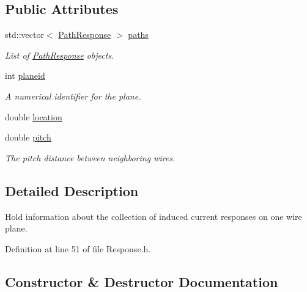 \subsection*{Public Attributes}
\begin{DoxyCompactItemize}
\item 
std\+::vector$<$ \hyperlink{struct_wire_cell_1_1_response_1_1_schema_1_1_path_response}{Path\+Response} $>$ \hyperlink{struct_wire_cell_1_1_response_1_1_schema_1_1_plane_response_a3c93c99a96e85b80eb298d12356d3e50}{paths}
\begin{DoxyCompactList}\small\item\em List of \hyperlink{struct_wire_cell_1_1_response_1_1_schema_1_1_path_response}{Path\+Response} objects. \end{DoxyCompactList}\item 
int \hyperlink{struct_wire_cell_1_1_response_1_1_schema_1_1_plane_response_ab039eb6a235ccaad959a333759584801}{planeid}
\begin{DoxyCompactList}\small\item\em A numerical identifier for the plane. \end{DoxyCompactList}\item 
double \hyperlink{struct_wire_cell_1_1_response_1_1_schema_1_1_plane_response_aacc9dfe4e52b217a966dba448a34cf88}{location}
\item 
double \hyperlink{struct_wire_cell_1_1_response_1_1_schema_1_1_plane_response_a75ace824dc59dc7b45953987c8e5c3b4}{pitch}
\begin{DoxyCompactList}\small\item\em The pitch distance between neighboring wires. \end{DoxyCompactList}\end{DoxyCompactItemize}


\subsection{Detailed Description}
Hold information about the collection of induced current responses on one wire plane. 

Definition at line 51 of file Response.\+h.



\subsection{Constructor \& Destructor Documentation}
\mbox{\label{struct_wire_cell_1_1_response_1_1_schema_1_1_plane_response_a5ee2c9c93a70c5b773283819996f4126}} 
